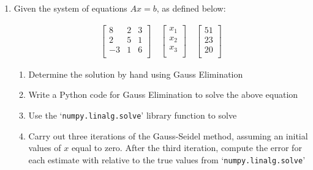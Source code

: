 \documentclass[a4paper,12pt]{article}
\begin{document}
\begin{enumerate}
	\item Given the system of equations $Ax = b$, as defined below:

	\begin{align*}
	\begin{bmatrix}
	8 & 2 & 3 \\
	2 & 5 & 1 \\
	-3 & 1 & 6 \\
	\end{bmatrix}
	\quad
	\begin{bmatrix}
	x_1 \\
	x_2 \\
	x_3 \\
	\end{bmatrix}
	\quad
	\begin{bmatrix}
	51 \\
	23 \\
	20 \\
	\end{bmatrix}
	\end{align*}
	\begin{enumerate}
		\item Determine the solution by hand using Gauss Elimination
		\item Write a Python code for Gauss Elimination to solve the above equation
		\item Use the `\verb|numpy.linalg.solve|' library function to solve
		\item Carry out three iterations of the Gauss-Seidel method, assuming an initial values of $x$ equal to zero. After the third iteration, compute the error for each estimate with relative to the true values from `\verb|numpy.linalg.solve|'
	\end{enumerate}


\end{enumerate}
\end{document}
